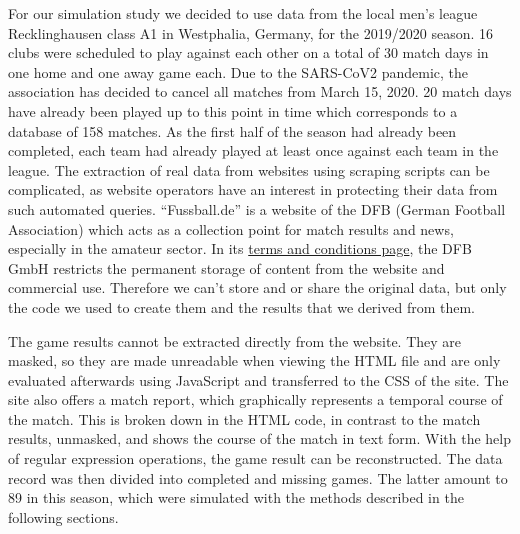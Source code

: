 \documentclass[12pt,a4paper]{article}
\begin{document}
For our simulation study we decided to use data from the local men's
league Recklinghausen class A1 in Westphalia, Germany, for the 2019/2020
season. 16 clubs were scheduled to play against each other on a total of
30 match days in one home and one away game each. Due to the SARS-CoV2
pandemic, the association has decided to cancel all matches from March
15, 2020. 20 match days have already been played up to this point in
time which corresponds to a database of 158 matches. As the first half
of the season had already been completed, each team had already played
at least once against each team in the league. The extraction of real
data from websites using scraping scripts can be complicated, as website
operators have an interest in protecting their data from such automated
queries. \enquote{Fussball.de} is a website of the DFB (German Football
Association) which acts as a collection point for match results and
news, especially in the amateur sector. In its
\href{http://www.fussball.de/terms.and.conditions\#!/}{terms and
conditions page}, the DFB GmbH restricts the permanent storage of
content from the website and commercial use. Therefore we can't store
and or share the original data, but only the code we used to create them
and the results that we derived from them.

The game results cannot be extracted directly from the website. They are
masked, so they are made unreadable when viewing the HTML file and are
only evaluated afterwards using JavaScript and transferred to the CSS of
the site. The site also offers a match report, which graphically
represents a temporal course of the match. This is broken down in the
HTML code, in contrast to the match results, unmasked, and shows the
course of the match in text form. With the help of regular expression
operations, the game result can be reconstructed. The data record was
then divided into completed and missing games. The latter amount to 89
in this season, which were simulated with the methods described in the
following sections.
\end{document}
